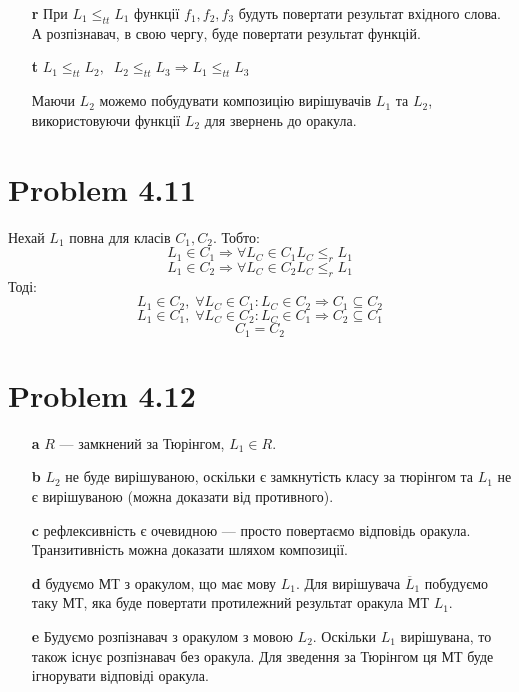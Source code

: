 \documentclass[12pt,letterpaper]{article}
\begin{document}
\[  \]

\begin{itemize}
    \item[\textbf{r}] При $L_1 \leq_{tt} L_1$ функції $f_1, f_2, f_3$ будуть повертати результат вхідного слова. А розпізнавач, в свою чергу, буде повертати результат функцій.
    \item[\textbf{t}] $L_1 \leq_{tt} L_2, \;\; L_2 \leq_{tt} L_3 \Rightarrow L_1 \leq_{tt} L_3$

        Маючи $L_2$ можемо побудувати композицію вирішувачів $L_1$ та $L_2$, використовуючи функції $L_2$ для звернень до оракула.
\end{itemize}

\section{Problem 4.11}

Нехай $L_1$ повна для класів $C_1, C_2$. Тобто:
\[ L_1 \in C_1 \Rightarrow \forall L_C \in C_1 L_C \leq_r L_1 \]
\[ L_1 \in C_2 \Rightarrow \forall L_C \in C_2 L_C \leq_r L_1 \]
Тоді:
\[ L_1 \in C_2, \; \forall L_C \in C_1 : L_C \in C_2 \Rightarrow C_1 \subseteq C_2 \]
\[ L_1 \in C_1, \; \forall L_C \in C_2 : L_C \in C_1 \Rightarrow C_2 \subseteq C_1 \]
\[ C_1 = C_2 \]

\section{Problem 4.12}

\begin{itemize}
    \item[\textbf{a}] $R$ --- замкнений за Тюрінгом, $L_1 \in R$.
    \item[\textbf{b}] $L_2$ не буде вирішуваною, оскільки є замкнутість класу за тюрінгом та $L_1$ не є вирішуваною (можна доказати від противного).
    \item[\textbf{c}] рефлексивність є очевидною --- просто повертаємо відповідь оракула.
        Транзитивність можна доказати шляхом композиції.
    \item[\textbf{d}] будуємо МТ з оракулом, що має мову $L_1$. Для вирішувача $\overline L_1$ побудуємо таку МТ, яка буде повертати протилежний результат оракула МТ $L_1$.
    \item[\textbf{e}] Будуємо розпізнавач з оракулом з мовою $L_2$. Оскільки $L_1$ вирішувана, то також існує розпізнавач без оракула. Для зведення за Тюрінгом ця МТ буде ігнорувати відповіді оракула.
\end{itemize}
\end{document}
